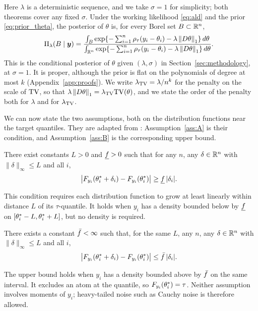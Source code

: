 Here $\lambda$ is a deterministic sequence, and we take $\sigma=1$ for simplicity; both theorems cover any fixed $\sigma$. Under the working likelihood \eqref{eq:ald} and the prior \eqref{eq:prior_theta}, the posterior of $\theta$ is, for every Borel set $B\subset\mathbb{R}^n$,
\begin{equation}\label{eq:post-fixed}
\Pi_\lambda(B\mid \bm{y})=\frac{\int_B\exp\{-\sum_{i=1}^n\rho_\tau(y_i-\theta_i)-\lambda\left\lVert D\theta\right\rVert_1\}\,d\theta}
{\int_{\mathbb{R}^n}\exp\{-\sum_{i=1}^n\rho_\tau(y_i-\theta_i)-\lambda\left\lVert D\theta\right\rVert_1\}\,d\theta}.
\end{equation}
This is the conditional posterior of $\theta$ given $(\lambda,\sigma)$ in Section~\ref{sec:methodology}, at $\sigma=1$. It is proper, although the prior is flat on the polynomials of degree at most $k$ (Appendix~\ref{app:proofs}). We write $\lambda_{\mathrm{TV}}=\lambda/n^{k}$ for the penalty on the scale of $\mathrm{TV}$, so that $\lambda\left\lVert D\theta\right\rVert_1=\lambda_{\mathrm{TV}}\mathrm{TV}(\theta)$, and we state the order of the penalty both for $\lambda$ and for $\lambda_{\mathrm{TV}}$.

We can now state the two assumptions, both on the distribution functions near the target quantiles. They are adapted from \citet{madrid2022risk}: Assumption~\ref{ass:A} is their condition, and Assumption~\ref{ass:B} is the corresponding upper bound.

\begin{assumption}\label{ass:A}
There exist constants $L>0$ and $\underline f>0$ such that for any $n$, any $\delta\in\mathbb{R}^n$ with $\|\delta\|_\infty\le L$ and all $i$,
\[
\bigl|F_{y_i}(\theta^{*}_i+\delta_i)-F_{y_i}(\theta^{*}_i)\bigr|\ge\underline f\,|\delta_i|.
\]
\end{assumption}

This condition requires each distribution function to grow at least linearly within distance $L$ of its $\tau$-quantile. It holds when $y_i$ has a density bounded below by $\underline f$ on $[\theta^{*}_i-L,\theta^{*}_i+L]$, but no density is required.

\begin{assumption}\label{ass:B}
There exists a constant $\bar f<\infty$ such that, for the same $L$, any $n$, any $\delta\in\mathbb{R}^n$ with $\|\delta\|_\infty\le L$ and all $i$,
\[
\bigl|F_{y_i}(\theta^{*}_i+\delta_i)-F_{y_i}(\theta^{*}_i)\bigr|\le\bar f\,|\delta_i|.
\]
\end{assumption}

The upper bound holds when $y_i$ has a density bounded above by $\bar f$ on the same interval. It excludes an atom at the quantile, so $F_{y_i}(\theta^{*}_i)=\tau$. Neither assumption involves moments of $y_i$; heavy-tailed noise such as Cauchy noise is therefore allowed.

